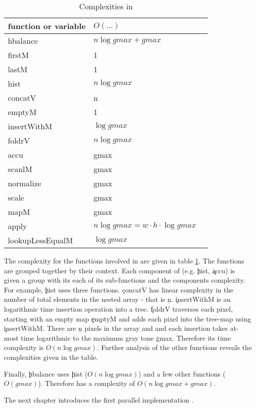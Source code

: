   \begin{table}[h!]
    \caption{Complexities in \seq}
    \label{table:seq}
    \centering
    \begin{tabular}{lll}
        \toprule
        function or variable & $O(...)$ \\
        \midrule
        hbalance          & $n \log gmax + gmax$ \\
        firstM           & 1\\ 
        lastM            & 1\\
        \midrule
        hist              & $n \log gmax$\\
        concatV          & n \\ 
        emptyM           & 1\\ 
        insertWithM      & $\log gmax$\\ 
        foldrV           & $n \log gmax$ \\ 
        \midrule
        accu              & gmax\\ 
        scanlM           & gmax\\
        \midrule
        normalize         & gmax\\ 
        scale             & gmax\\ 
        mapM             & gmax\\ 
        \midrule
        apply             & $n \log gmax = w \cdot h \cdot \log gmax$ \\
        lookupLessEqualM & $\log gmax$ \\ 
    \end{tabular}
  \end{table}
  
  The complexity for the functions involved in \seq are given
  in table \ref{table:seq}.
  The functions are grouped together by their context.
  Each component of \seq (e.g. \c{hist}, \c{accu}) is
  given a group with its each of its sub-functions and
  the components complexity.
  For example, \c{hist} uses three functions.
  \c{concatV} has linear complexity in the number
  of total elements in the nested array - that is \c{n}.
  \c{insertWithM} is an logarithmic time insertion operation
  into a tree. \c{foldrV} traverses each pixel,
  starting with an empty map \c{emptyM} and
  adds each pixel into the tree-map using \c{insertWithM}.
  There are \c{n} pixels in the array and and each insertion
  takes at-most time logarithmic to the maximum gray tone \c{gmax}.
  Therefore its time complexity is $O(n \log gmax)$.
  Further analysis of the other functions reveals the complexities
  given in the table.
  
  
  Finally, \c{hbalance} uses
  \c{hist} ($O(n \log gmax)$) and a few
  other functions ($O(gmax)$). 
  Therefore \seq has a complexity of $O(n \log gmax + gmax)$.
  
  \p
  The next chapter introduces the first parallel implementation \man.
  
